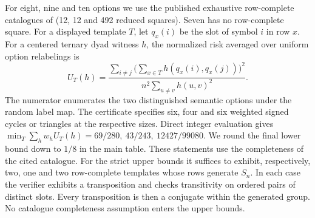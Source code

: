 For eight, nine and ten options we use the published exhaustive
row-complete catalogues of \citet{wanlesscatalogue} (12, 12 and 492
reduced squares). Seven has no row-complete square. For a displayed
template $T$, let $q_x(i)$ be the slot of symbol $i$ in row $x$.
For a centered ternary dyad witness $h$, the normalized risk averaged
over uniform option relabelings is
\[
 U_T(h)=
 \frac{\sum_{i\ne j}\big(\sum_{x\in T}h(q_x(i),q_x(j))\big)^2}
      {n^2\sum_{u\ne v}h(u,v)^2}.
\]
The numerator enumerates the two distinguished semantic options under
the random label map. The certificate specifies six, four and six
weighted signed cycles or triangles at the respective sizes.
Direct integer evaluation gives
$\min_T\sum_h w_h U_T(h)=69/280,\ 43/243,\ 12427/99080$.
We round the final lower bound down to $1/8$ in the main table.
These statements use the completeness of the cited catalogue. For the
strict upper bounds it suffices to exhibit, respectively, two, one and
two row-complete templates whose rows generate $S_n$. In each case
the verifier exhibits a transposition and checks transitivity on
ordered pairs of distinct slots. Every transposition is then a
conjugate within the generated group. No catalogue completeness
assumption enters the upper bounds.


